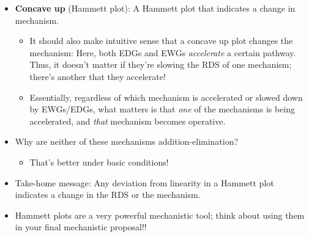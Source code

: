 \documentclass[../notes.tex]{subfiles}
\begin{document}
\begin{itemize}
\begin{figure}[h!]
\begin{subfigure}[b]{0.36\linewidth}
            \caption{Ethyl ester.}
            \label{fig:HammettEsterb}
        \end{subfigure}
        \caption{Hammett plots for ester hydrolysis.}
        \label{fig:HammettEster}
    \end{figure}
    \begin{itemize}
        \item The hydrolysis of a methyl ester displays a constant, negative sensitivity factor (Figure \ref{fig:HammettEstera}).
        \begin{itemize}
            \item This is because the positively charged acylium ion intermediate gets destabilized by stronger EWGs.
        \end{itemize}
        \item The hydrolysis of an ethyl ester displays a negative sensitivity factor for EDGs, and a positive sensitivity factor for EWGs (Figure \ref{fig:HammettEsterb}).
        \begin{itemize}
            \item When  is an EDG, the acylium ion get stabilized. Weaker EDGs stabilize it less ($\rho=-$), but we still favor the elimination-addition mechanism (Figure \ref{fig:EsterHydb}).
            \item When  is an EWG, the carboxylic acid is a better leaving group (\ref{fig:EsterHydc}). This corresponds to a positive Hammett slope.
        \end{itemize}
    \end{itemize}
    \item \textbf{Concave up} (Hammett plot): A Hammett plot that indicates a change in mechanism.
    \begin{itemize}
        \item It should also make intuitive sense that a concave up plot changes the mechanism: Here, both EDGs and EWGs \emph{accelerate} a certain pathway. Thus, it doesn't matter if they're slowing the RDS of one mechanism; there's another that they accelerate!
        \item Essentially, regardless of which mechanism is accelerated or slowed down by EWGs/EDGs, what matters is that \emph{one} of the mechanisms is being accelerated, and \emph{that} mechanism becomes operative.
    \end{itemize}
    \item Why are neither of these mechanisms addition-elimination?
    \begin{itemize}
        \item That's better under basic conditions!
    \end{itemize}
    \item Take-home message: Any deviation from linearity in a Hammett plot indicates a change in the RDS or the mechanism.
    \item Hammett plots are a very powerful mechanistic tool; think about using them in your final mechanistic proposal!!
\end{itemize}
\end{document}
